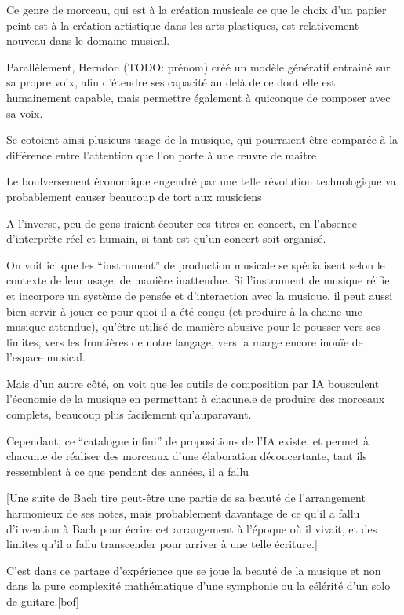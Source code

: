 Ce genre de morceau, qui est à la création musicale ce que le choix d'un papier peint est à la création artistique dans les arts plastiques, est relativement nouveau dans le domaine musical. 

Parallèlement, Herndon (TODO: prénom) créé un modèle génératif entrainé sur sa propre voix, afin d'étendre ses capacité au delà de ce dont elle est humainement capable, mais permettre également à quiconque de composer avec sa voix.

Se cotoient ainsi plusieurs usage de la musique, qui pourraient être comparée à la différence entre l'attention que l'on porte à une œuvre de maitre 

Le boulversement économique engendré par une telle révolution technologique va probablement causer beaucoup de tort aux musiciens

A l'inverse, peu de gens iraient écouter ces titres en concert, en l'absence d'interprète réel et humain, si tant est qu'un concert soit organisé.

On voit ici que les ``instrument'' de production musicale se spécialisent selon le contexte de leur usage, de manière inattendue.
Si l'instrument de musique réifie et incorpore un système de pensée et d'interaction avec la musique, il peut aussi bien servir à jouer ce pour quoi il a été conçu (et produire à la chaine une musique attendue), qu'être utilisé de manière abusive pour le pousser vers ses limites, vers les frontières de notre langage, vers la marge encore inouïe de l'espace musical.

Mais d'un autre côté, on voit que les outils de composition par IA bousculent l'économie de la musique en permettant à chacune.e de produire des morceaux complets, beaucoup plus facilement qu'auparavant.

Cependant, ce ``catalogue infini'' de propositions de l'IA existe, et permet à chacun.e de réaliser des morceaux d'une élaboration déconcertante, tant ils ressemblent à ce que pendant des années, il a fallu 

[Une suite de Bach tire peut-être une partie de sa beauté de l'arrangement harmonieux de ses notes, mais probablement davantage de ce qu'il a fallu d'invention à Bach pour écrire cet arrangement à l'époque où il vivait, et des limites qu'il a fallu transcender pour arriver à une telle écriture.]

C'est dans ce partage d'expérience que se joue la beauté de la musique et non dans la pure complexité mathématique d'une symphonie ou la célérité d'un solo de guitare.[bof]

